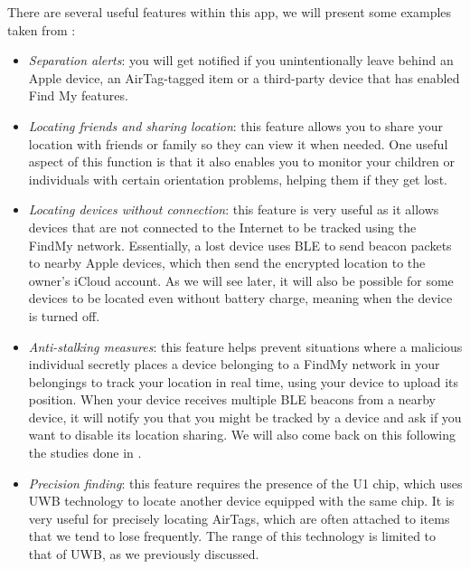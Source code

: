 \documentclass[english]{article}
\begin{document}
There are several useful features within this app, we will present some examples taken from \cite{Clover_2022}:
\begin{itemize}
  \item \textit{Separation alerts}: you will get notified if you unintentionally leave behind an Apple device, an AirTag-tagged item or a third-party device that has enabled Find My features.
  \item \textit{Locating friends and sharing location}: this feature allows you to share your location with friends or family so they can view it when needed. One useful aspect of this function is that it also enables you to monitor your children or individuals with certain orientation problems, helping them if they get lost.
  \item \textit{Locating devices without connection}: this feature is very useful as it allows devices that are not connected to the Internet to be tracked using the FindMy network. Essentially, a lost device uses BLE to send beacon packets to nearby Apple devices, which then send the encrypted location to the owner's iCloud account. As we will see later, it will also be possible for some devices to be located even without battery charge, meaning when the device is turned off.
  \item \textit{Anti-stalking measures}: this feature helps prevent situations where a malicious individual secretly places a device belonging to a FindMy network in your belongings to track your location in real time, using your device to upload its position. When your device receives multiple BLE beacons from a nearby device, it will notify you that you might be tracked by a device and ask if you want to disable its location sharing. We will also come back on this following the studies done in \cite{airguard}.
  \item \textit{Precision finding}: this feature requires the presence of the U1 chip, which uses UWB technology to locate another device equipped with the same chip. It is very useful for precisely locating AirTags, which are often attached to items that we tend to lose frequently. The range of this technology is limited to that of UWB, as we previously discussed.
\end{itemize}
\end{document}
